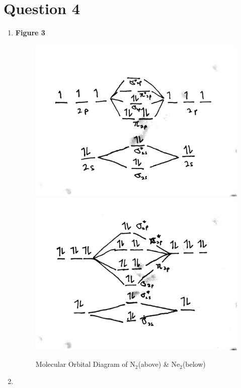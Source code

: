 \documentclass[a4paper, fleqn]{article}
\begin{document}
\section{Question 4}
\begin{enumerate}[label=(\alph{*})]
\item \textbf{Figure 3}
\begin{figure}[h!]
\includegraphics[width=\linewidth]{./assets/201802120600.jpg}
\includegraphics[width=\linewidth]{./assets/201802120606.jpg}
\caption{Molecular Orbital Diagram of N$_2$(above) \& Ne$_2$(below)}
\label{figure:graph3}
\end{figure}
\item \begin{itemize}

\end{itemize}
\end{enumerate}
\end{document}
